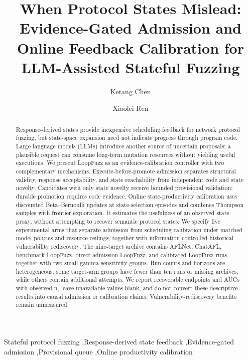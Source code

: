 \documentclass[final,5p,times,number]{elsarticle}
\begin{document}
\begin{frontmatter}
\title{When Protocol States Mislead: Evidence-Gated Admission and Online Feedback Calibration for LLM-Assisted Stateful Fuzzing}
\author[inst1]{Ketang Chen}
\author[inst1]{Xiaolei Ren}
\begin{abstract}
Response-derived states provide inexpensive scheduling feedback for network protocol fuzzing, but state-space expansion need not indicate progress through program code. Large language models (LLMs) introduce another source of uncertain proposals: a plausible request can consume long-term mutation resources without yielding useful executions. We present LoopFuzz as an evidence-calibration controller with two complementary mechanisms. Execute-before-promote admission separates structural validity, response acceptability, and state reachability from independent code and state novelty. Candidates with only state novelty receive bounded provisional validation; durable promotion requires code evidence. Online state-productivity calibration uses discounted Beta--Bernoulli updates at state-selection episodes and combines Thompson samples with frontier exploration. It estimates the usefulness of an observed state proxy, without attempting to recover semantic protocol states. We specify five experimental arms that separate admission from scheduling calibration under matched model policies and resource ceilings, together with information-controlled historical vulnerability rediscovery. The nine-target archive contains AFLNet, ChatAFL, benchmark LoopFuzz, direct-admission LoopFuzz, and calibrated LoopFuzz runs, together with two small gamma sensitivity groups. Run counts and horizons are heterogeneous: some target-arm groups have fewer than ten runs or missing archives, while others contain additional attempts. We report recoverable endpoints and AUCs with observed n, leave unavailable values blank, and do not convert these descriptive results into causal admission or calibration claims. Vulnerability-rediscovery benefits remain unmeasured.
\end{abstract}
\begin{keyword}
Stateful protocol fuzzing \sep Response-derived state feedback \sep Evidence-gated admission \sep Provisional queue \sep Online productivity calibration
\end{keyword}
\end{frontmatter}
\end{document}
